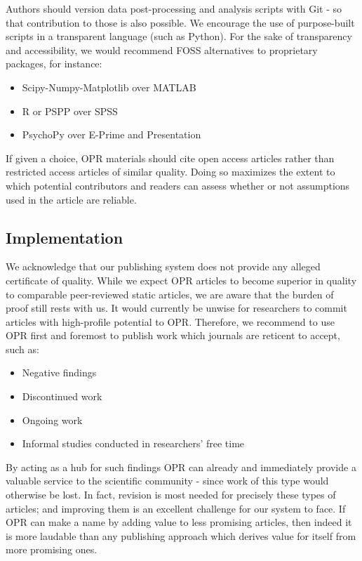 Authors should version data post-processing and analysis scripts with Git - so that contribution to those is also possible.
We encourage the use of purpose-built scripts in a transparent language (such as Python).
For the sake of transparency and accessibility, we would recommend FOSS alternatives to proprietary packages, for instance:
\begin{itemize}
	\item Scipy-Numpy-Matplotlib\cite{numpy} over MATLAB
	\item R\cite{r} or PSPP\cite{pspp} over SPSS
	\item PsychoPy\cite{psychopy,Peirce2007} over E-Prime and Presentation
\end{itemize}
If given a choice, OPR materials should cite open access articles rather than restricted access articles of similar quality.
Doing so maximizes the extent to which potential contributors and readers can assess whether or not assumptions used in the article are reliable.
\subsection{Implementation}
We acknowledge that our publishing system does not provide any alleged certificate of quality.
While we expect OPR articles to become superior in quality to comparable peer-reviewed static articles, we are aware that the burden of proof still rests with us.
It would currently be unwise for researchers to commit articles with high-profile potential to OPR.
Therefore, we recommend to use OPR first and foremost to publish work which journals are reticent to accept, such as:
\begin{itemize}
	\item Negative findings
	\item Discontinued work
	\item Ongoing work
	\item Informal studies conducted in researchers' free time
\end{itemize}
By acting as a hub for such findings OPR can already and immediately provide a valuable service to the scientific community - since work of this type would otherwise be lost.
In fact, revision is most needed for precisely these types of articles;
and improving them is an excellent challenge for our system to face.
If OPR can make a name by adding value to less promising articles, then indeed it is more laudable than any publishing approach which derives value for itself from more promising ones.


